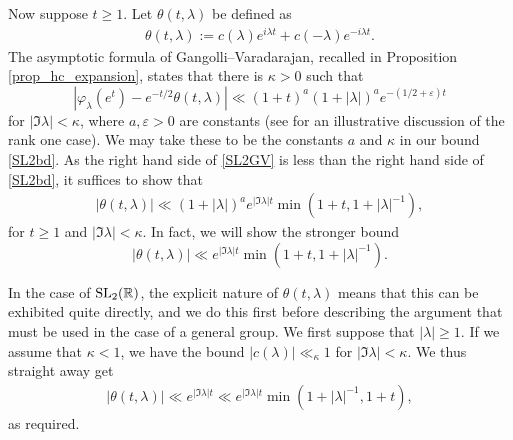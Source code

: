 \documentclass[12pt]{amsart}
\theoremstyle{remark}
\newcommand{\R}{\mathbb R}
\newcommand{\be}{\begin{equation}}
\newcommand{\ee}{\end{equation}}
\begin{document}
Now suppose $t \geq 1$. Let $\theta(t, \lambda)$ be defined as
\begin{gather}
    \theta(t, \lambda) := c(\lambda) e^{i \lambda t} + c(-\lambda) e^{-i \lambda t}.
\end{gather}
The asymptotic formula of Gangolli--Varadarajan, recalled in Proposition \ref{prop_hc_expansion}, states that there is $\kappa > 0$ such that
\be
\label{SL2GV}
    |\varphi_{\lambda}(e^t) - e^{-t/2} \theta(t, \lambda)| \ll (1 + t)^a (1 + |\lambda|)^a e^{-(1/2 + \varepsilon) t}
\ee
for $|\Im \lambda| < \kappa$, where $a, \varepsilon > 0$ are constants (see \cite[\S 5.1]{Gangolli_Varadarajan_88} for an illustrative discussion of the rank one case).  We may take these to be the constants $a$ and $\kappa$ in our bound \eqref{SL2bd}.  As the right hand side of \eqref{SL2GV} is less than the right hand side of \eqref{SL2bd}, it suffices to show that
\begin{gather}
\label{thetabd1}
    |\theta(t, \lambda)| \ll (1 + |\lambda|)^a e^{|\Im \lambda| t} \min (1 + t, 1 + |\lambda|^{-1}),
\end{gather}
for $t \geq 1$ and $|\Im \lambda| < \kappa$. In fact, we will show the stronger bound
\be
\label{thetabd2}
|\theta(t, \lambda)| \ll e^{|\Im \lambda| t} \min (1 + t, 1 + |\lambda|^{-1}).
\ee


In the case of ${\rm SL}_2(\R)$, the explicit nature of $\theta(t, \lambda)$ means that this can be exhibited quite directly, and we do this first before describing the argument that must be used in the case of a general group.  We first suppose that $|\lambda| \geq 1$.  If we assume that $\kappa < 1$, we have the bound $|c(\lambda)| \ll_\kappa 1$ for $|\Im \lambda| < \kappa$. We thus straight away get
\begin{gather*}
    |\theta(t, \lambda)| \ll e^{|\Im \lambda| t} \ll e^{|\Im \lambda| t} \min(1 + |\lambda|^{-1}, 1 + t),
\end{gather*}
as required.
\end{document}

